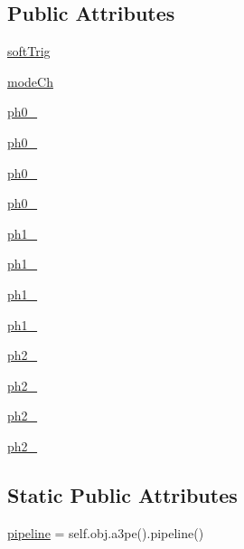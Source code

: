 \subsection*{Public Attributes}
\begin{DoxyCompactItemize}
\item 
\hyperlink{classProto40MHz__v1_1_1Proto40MHz__v1_a64f1852e9039bb3719089edda617a019}{soft\+Trig}
\item 
\hyperlink{classProto40MHz__v1_1_1Proto40MHz__v1_a9c4e7fa9c6a355546083db84ac5893ce}{mode\+Ch}
\item 
\hyperlink{classProto40MHz__v1_1_1Proto40MHz__v1_a4b216b21369890235d4d9eba8c5f1346}{ph0\+\_}
\item 
\hyperlink{classProto40MHz__v1_1_1Proto40MHz__v1_a78d05d26e0f0d655ee62903b2783dd78}{ph0\+\_}
\item 
\hyperlink{classProto40MHz__v1_1_1Proto40MHz__v1_af670d5ea48c5410e3564d1982dc3d4d9}{ph0\+\_}
\item 
\hyperlink{classProto40MHz__v1_1_1Proto40MHz__v1_a357b413847e01478f176248a8d37d038}{ph0\+\_}
\item 
\hyperlink{classProto40MHz__v1_1_1Proto40MHz__v1_af595e54769bd27e92a65a126a7a16e2a}{ph1\+\_}
\item 
\hyperlink{classProto40MHz__v1_1_1Proto40MHz__v1_a573e9e71d8f3e4a9eb413d401bf9810f}{ph1\+\_}
\item 
\hyperlink{classProto40MHz__v1_1_1Proto40MHz__v1_aeb9f8960dbac8bb72c81491cca688c23}{ph1\+\_}
\item 
\hyperlink{classProto40MHz__v1_1_1Proto40MHz__v1_a174e1c984c321727905b4287384f41fc}{ph1\+\_}
\item 
\hyperlink{classProto40MHz__v1_1_1Proto40MHz__v1_a40aa8b87961ddf4b8a4c307d3f533a0d}{ph2\+\_}
\item 
\hyperlink{classProto40MHz__v1_1_1Proto40MHz__v1_aa1c807dde7604ed8ecf187dc233eaa74}{ph2\+\_}
\item 
\hyperlink{classProto40MHz__v1_1_1Proto40MHz__v1_a29f0c8ddd6f232ad4b7a0a81d7c08cce}{ph2\+\_}
\item 
\hyperlink{classProto40MHz__v1_1_1Proto40MHz__v1_aaafcf5d95c911ded4a8d0edab58dc51d}{ph2\+\_}
\end{DoxyCompactItemize}
\subsection*{Static Public Attributes}
\begin{DoxyCompactItemize}
\item 
\hyperlink{classProto40MHz__v1_1_1Proto40MHz__v1_a8d5d6fc9d38418b0515a87cf60afbe78}{pipeline} = self.\+obj.\+a3pe().pipeline()
\end{DoxyCompactItemize}


